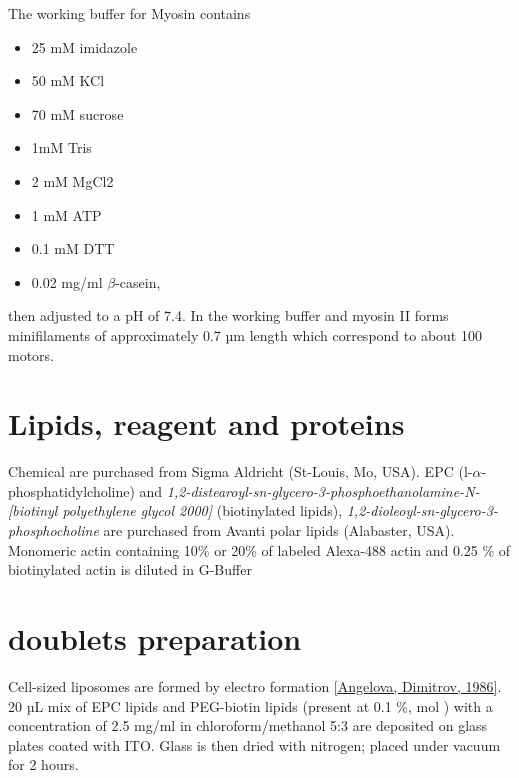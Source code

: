 \documentclass[A4paperpaper,11pt,english]{sphinxmanual}
\begin{document}
The working buffer for Myosin contains
\begin{itemize}
\item {} 
25 mM imidazole

\item {} 
50 mM KCl

\item {} 
70 mM sucrose

\item {} 
1mM Tris

\item {} 
2 mM MgCl2

\item {} 
1 mM ATP

\item {} 
0.1 mM DTT

\item {} 
0.02 mg/ml \(\beta\)-casein,

\end{itemize}

then adjusted to a pH  of 7.4.
In the working buffer and myosin II
forms minifilaments of approximately 0.7 µm length which correspond to about 100
motors.


\section{Lipids, reagent and proteins}
\label{parts/part2:lipids-reagent-and-proteins}
Chemical are purchased from Sigma Aldricht (St-Louis, Mo, USA). EPC (l-\(\alpha\)-phosphatidylcholine) and \emph{1,2-distearoyl-sn-glycero-3-phosphoethanolamine-N-{[}biotinyl polyethylene glycol 2000{]}} (biotinylated lipids), \emph{1,2-dioleoyl-sn-glycero-3-phosphocholine} are purchased from Avanti polar lipids (Alabaster, USA).
Monomeric actin containing 10\% or 20\% of labeled Alexa-488
actin and 0.25 \% of biotinylated actin is diluted in G-Buffer


\section{doublets preparation}
\label{parts/part2:electroformation}\label{parts/part2:doublets-preparation}
Cell-sized liposomes are formed by electro formation {\hyperref[parts/part2:angelova1986]{{[}Angelova, Dimitrov,  1986{]}}}.
20 µL mix of EPC lipids and PEG-biotin lipids (present at 0.1 \%, mol ) with a
concentration of 2.5 mg/ml in chloroform/methanol 5:3 are deposited on glass
plates coated with  ITO. Glass is then dried with  nitrogen; placed
under vacuum for 2 hours.
\end{document}
